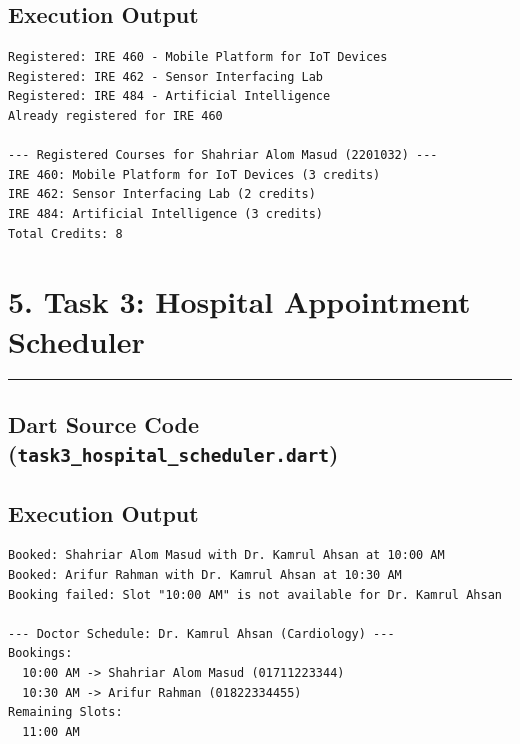 \documentclass[11pt,a4paper]{article}
\begin{document}
\vspace{0.2cm}
\subsection*{Execution Output}
\begin{lstlisting}[style=bashstyle]
Registered: IRE 460 - Mobile Platform for IoT Devices
Registered: IRE 462 - Sensor Interfacing Lab
Registered: IRE 484 - Artificial Intelligence
Already registered for IRE 460

--- Registered Courses for Shahriar Alom Masud (2201032) ---
IRE 460: Mobile Platform for IoT Devices (3 credits)
IRE 462: Sensor Interfacing Lab (2 credits)
IRE 484: Artificial Intelligence (3 credits)
Total Credits: 8
\end{lstlisting}

\newpage

\section*{5. Task 3: Hospital Appointment Scheduler}
\noindent\rule{\textwidth}{0.5pt}\vspace{0.15cm}

\subsection*{Dart Source Code (\texttt{task3\_hospital\_scheduler.dart})}


\vspace{0.15cm}
\subsection*{Execution Output}
\begin{lstlisting}[style=bashstyle]
Booked: Shahriar Alom Masud with Dr. Kamrul Ahsan at 10:00 AM
Booked: Arifur Rahman with Dr. Kamrul Ahsan at 10:30 AM
Booking failed: Slot "10:00 AM" is not available for Dr. Kamrul Ahsan

--- Doctor Schedule: Dr. Kamrul Ahsan (Cardiology) ---
Bookings:
  10:00 AM -> Shahriar Alom Masud (01711223344)
  10:30 AM -> Arifur Rahman (01822334455)
Remaining Slots:
  11:00 AM
\end{lstlisting}
\end{document}
